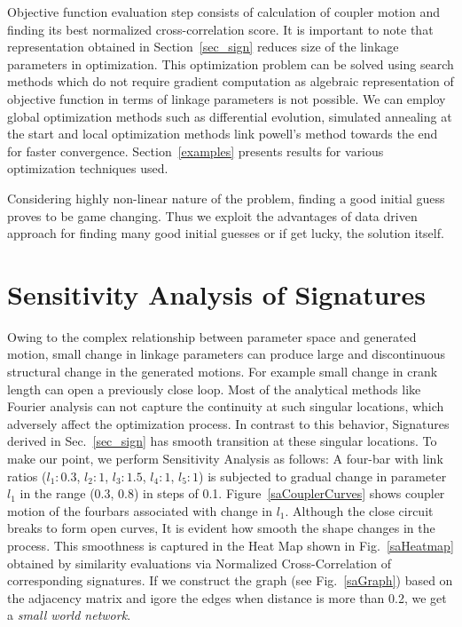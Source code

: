 \documentclass[twocolumn,10pt]{asme2ej}
\begin{document}
Objective function evaluation step consists of calculation of coupler motion and finding its best normalized cross-correlation score.
It is important to note that representation obtained in Section~\ref{sec_sign} reduces size of the linkage parameters in optimization.
This optimization problem can be solved using search methods which do not require gradient computation as algebraic representation of objective function in terms of linkage parameters is not possible.
We can employ global optimization methods such as differential evolution, simulated annealing at the start and local optimization methods link powell's method towards the end for faster convergence\cite{ullah1997}.
Section~\ref{examples} presents results for various optimization techniques used.

Considering highly non-linear nature of the problem, finding a good initial guess proves to be game changing.
Thus we exploit the advantages of data driven approach for finding many good initial guesses or if get lucky, the solution itself.

\section{Sensitivity Analysis of Signatures}
Owing to the complex relationship between parameter space and generated motion, small change in linkage parameters can produce large and discontinuous structural change in the generated motions.
For example small change in crank length can open a previously close loop.
Most of the analytical methods like Fourier analysis can not capture the continuity at such singular locations, which adversely affect the optimization process.
In contrast to this behavior, Signatures derived in Sec.~\ref{sec_sign} has smooth transition at these singular locations.
To make our point, we perform Sensitivity Analysis as follows:
A four-bar with link ratios ($l_1:0.3$, $l_2:1$, $l_3:1.5$, $l_4:1$, $l_5:1$) is subjected to gradual change in parameter $l_1$ in the range (0.3, 0.8) in steps of 0.1.
Figure~\ref{saCouplerCurves} shows coupler motion of the fourbars associated with change in $l_1$.
Although the close circuit breaks to form open curves, It is evident how smooth the shape changes in the process.
This smoothness is captured in the Heat Map shown in Fig.~\ref{saHeatmap} obtained by similarity evaluations via Normalized Cross-Correlation of corresponding signatures.
If we construct the graph (see Fig.~\ref{saGraph}) based on the adjacency matrix and igore the edges when distance is more than 0.2, we get a \emph{small world network}\cite{watts1998}.
\end{document}
